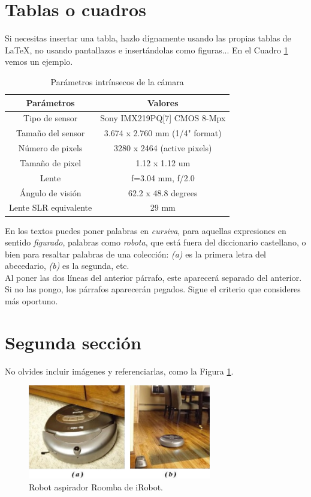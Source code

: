 \section{Tablas o cuadros}

Si necesitas insertar una tabla, hazlo dígnamente usando las propias tablas de \LaTeX, no usando pantallazos e insertándolas como figuras... En el Cuadro \ref{cuadro:ejemplo} vemos un ejemplo.

\begin{table}[H]
\begin{center}
\begin{tabular}{|c|c|}
\hline
\textbf{Parámetros} & \textbf{Valores} \\
\hline
Tipo de sensor & Sony IMX219PQ[7] CMOS 8-Mpx \\
Tamaño del sensor & 3.674 x 2.760 mm (1/4" format) \\
Número de pixels & 3280 x 2464 (active pixels) \\
Tamaño de pixel & 1.12 x 1.12 um \\
Lente & f=3.04 mm, f/2.0 \\
Ángulo de visión & 62.2 x 48.8 degrees \\
Lente SLR equivalente & 29 mm \\
\hline
\end{tabular}
\caption{Parámetros intrínsecos de la cámara}
\label{cuadro:ejemplo}
\end{center}
\end{table}

En los textos puedes poner palabras en \textit{cursiva}, para aquellas expresiones en sentido \textit{figurado}, palabras como \textit{robota}, que está fuera del diccionario castellano, o bien para resaltar palabras de una colección: \textit{(a)} es la primera letra del abecedario, \textit{(b)} es la segunda, etc.\\

Al poner las dos líneas del anterior párrafo, este aparecerá separado del anterior. Si no las pongo, los párrafos aparecerán pegados. Sigue el criterio que consideres más oportuno.

\section{Segunda sección}
\label{sec:segundaseccion}

No olvides incluir imágenes y referenciarlas, como la Figura \ref{fig:roomba}.

\begin{figure} [h!]
	\begin{center}
		\includegraphics[width=8cm]{figs/roomba}
	\end{center}
	\caption{Robot aspirador Roomba de iRobot.}
	\label{fig:roomba}
\end{figure}\

